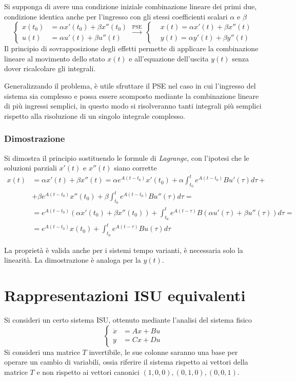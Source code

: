Si supponga di avere una condizione iniziale combinazione lineare dei primi
due, condizione identica anche per l'ingresso con gli stessi coefficienti
scalari $\alpha$ e $\beta$
$$\left\{\begin{aligned}
x(t_0) &= \alpha x'(t_0) + \beta x''(t_0)\\
u(t) &= \alpha u'(t) + \beta u''(t)
\end{aligned}\right.\stackrel{\text{PSE}}{\longrightarrow}\
\left\{\begin{aligned}
&x(t) = \alpha x'(t) + \beta x''(t)\\
&y(t) = \alpha y'(t) + \beta y''(t)
\end{aligned}\right.
$$
Il principio di sovrapposizione degli effetti permette di applicare la
combinazione lineare al movimento dello stato $x(t)$ e all'equazione
dell'uscita $y(t)$ senza dover ricalcolare gli integrali.

Generalizzando il problema, è utile sfruttare il PSE nel caso in cui l'ingresso
del sistema sia complesso e possa essere scomposto mediante la combinazione
lineare di più ingressi semplici, in questo modo si risolveranno tanti
integrali più semplici rispetto alla risoluzione di un singolo integrale
complesso.

\subsubsection{Dimostrazione}
Si dimostra il principio sostituendo le formule di \textit{Lagrange}, con
l'ipotesi che le soluzioni parziali $x'(t)$ e $x''(t)$ siano corrette
$$\begin{aligned}
x(t) &= \alpha x'(t) + \beta x''(t) = \alpha e^{A(t-t_0)}x'(t_0) + \alpha
\int_{t_0}^t e^{A(t-t_0)}Bu'(\tau)d\tau + \\
 &+ \beta e^{A(t-t_0)}x''(t_0) + \beta\int_{t_0}^t e^{A(t-t_0)} B
u''(\tau)d\tau =\\
&= e^{A(t-t_0)}\left(\alpha x'(t_0) + \beta x''(t_0)\right) + \int_{t_0}^t
e^{A(t-\tau)} B \left(\alpha u'(\tau) + \beta u''(\tau)\right) d\tau =\\
&= e^{A(t-t_0)}x(t_0)  + \int_{t_0}^t
e^{A(t-\tau)}Bu(\tau)d\tau
\end{aligned}$$

La proprietà è valida anche per i sistemi tempo varianti, è necessaria solo la
linearità.
La dimostrazione è analoga per la $y(t)$.


\section{Rappresentazioni ISU equivalenti}
Si consideri un certo sistema ISU, ottenuto mediante l'analisi del sistema
fisico
$$
\left\{\begin{aligned}
\dot{x} &= Ax + Bu \\
y & = Cx + Du
\end{aligned}\right.
$$
Si consideri una matrice $T$ invertibile, le sue colonne saranno una base per
operare un cambio di variabili, ossia riferire il sistema rispetto ai vettori
della matrice $T$ e non rispetto ai vettori canonici $(1,0,0),(0,1,0),(0,0,1)$.

